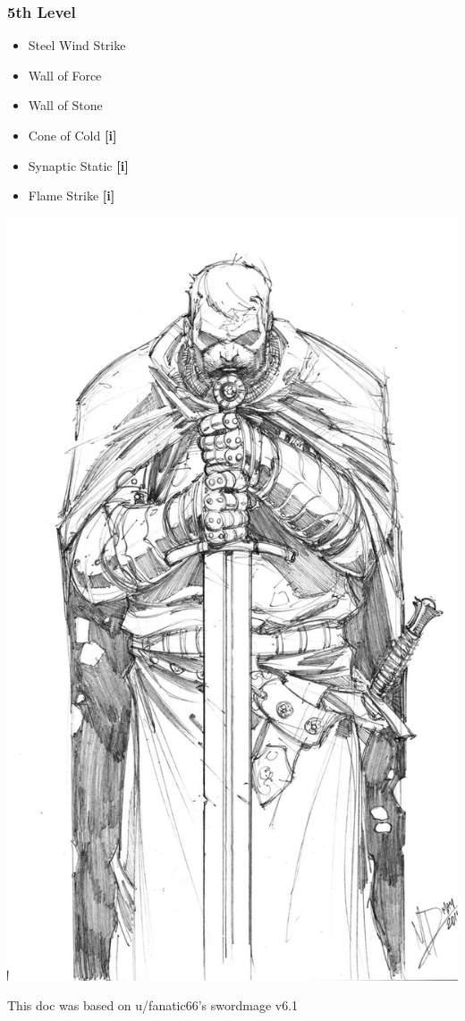 \begin{multicols*}{3}
\begin{small}
\subsubsection{5th Level}

\begin{itemize}
\item Steel Wind Strike
\item Wall of Force
\item Wall of Stone 
\item Cone of Cold \textbf{[i]}
\item Synaptic Static \textbf{[i]}
\item Flame Strike \textbf{[i]}
\end{itemize}


\begin{Figure}
\centering
\includegraphics[width=\textwidth]{img/holy.png}
\end{Figure}   


\smallskip

{\color{red} This doc was based on u/fanatic66's swordmage v6.1 }
    
\end{small}
\end{multicols*}